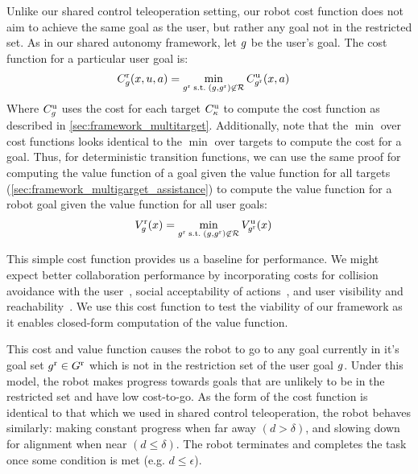 Unlike our shared control teleoperation setting, our robot cost function does not aim to achieve the same goal as the user, but rather any goal not in the restricted set. As in our shared autonomy framework, let $g$ be the user's goal. The cost function for a particular user goal is:
\begin{align*}
  C_g^{\text{r}}(x, u, a) &= \min_{g^{\text{r}} \text{\;s.t.\;} (g, g^{\text{r}}) \not\in \mathcal{R}} C^{\text{u}}_{g^{\text{r}}}(x, a)
\end{align*}
Where $C_g^{\text{u}}$ uses the cost for each target $C_{\kappa}^{\text{u}}$ to compute the cost function as described in \cref{sec:framework_multitarget}. Additionally, note that the $\min$ over cost functions looks identical to the $\min$ over targets to compute the cost for a goal. Thus, for deterministic transition functions, we can use the same proof for computing the value function of a goal given the value function for all targets (\cref{sec:framework_multigarget_assistance}) to compute the value function for a robot goal given the value function for all user goals:
\begin{align*}
  V_{g}^{\text{r}}(x) &= \min_{g^{\text{r}} \text{\;s.t.\;} (g, g^{\text{r}}) \not\in \mathcal{R}} V^{\text{u}}_{g^{\text{r}}}(x)
\end{align*}

This simple cost function provides us a baseline for performance. We might expect better collaboration performance by incorporating costs for collision avoidance with the user~\citep{mainprice_2013, lasota_2015}, social acceptability of actions~\citep{sisbot_2007}, and user visibility and reachability~\citep{sisbot_2010, pandey_2010, mainprice_2011}. We use this cost function to test the viability of our framework as it enables closed-form computation of the value function.

This cost and value function causes the robot to go to any goal currently in it's goal set $g^{\text{r}} \in G^{\text{r}}$ which is not in the restriction set of the user goal $g$. Under this model, the robot makes progress towards goals that are unlikely to be in the restricted set and have low cost-to-go. As the form of the cost function is identical to that which we used in shared control teleoperation, the robot behaves similarly: making constant progress when far away $(d > \delta)$, and slowing down for alignment when near $(d \leq \delta)$. The robot terminates and completes the task once some condition is met (e.g. $d \leq \epsilon$).


